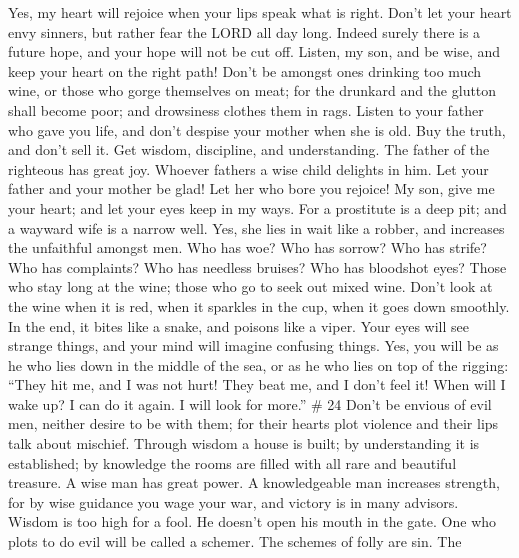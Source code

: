 Yes, my heart will rejoice when your lips speak what is right.
 Don't let your heart envy sinners, but rather fear the
LORD all day long.  Indeed surely there is a future hope,
and your hope will not be cut off.  Listen, my son, and be
wise, and keep your heart on the right path!  Don't be
amongst ones drinking too much wine, or those who gorge themselves on
meat;  for the drunkard and the glutton shall become poor;
and drowsiness clothes them in rags.  Listen to your father
who gave you life, and don't despise your mother when she is old.
 Buy the truth, and don't sell it. Get wisdom, discipline,
and understanding.  The father of the righteous has great
joy. Whoever fathers a wise child delights in him.  Let
your father and your mother be glad! Let her who bore you rejoice!
 My son, give me your heart; and let your eyes keep in my
ways.  For a prostitute is a deep pit; and a wayward wife
is a narrow well.  Yes, she lies in wait like a robber, and
increases the unfaithful amongst men.  Who has woe? Who has
sorrow? Who has strife? Who has complaints? Who has needless bruises?
Who has bloodshot eyes?  Those who stay long at the wine;
those who go to seek out mixed wine.  Don't look at the
wine when it is red, when it sparkles in the cup, when it goes down
smoothly.  In the end, it bites like a snake, and poisons
like a viper.  Your eyes will see strange things, and your
mind will imagine confusing things.  Yes, you will be as he
who lies down in the middle of the sea, or as he who lies on top of the
rigging:  ``They hit me, and I was not hurt! They beat me,
and I don't feel it! When will I wake up? I can do it again. I will look
for more.'' \# 24  Don't be envious of evil men, neither
desire to be with them;  for their hearts plot violence and
their lips talk about mischief.  Through wisdom a house is
built; by understanding it is established;  by knowledge the
rooms are filled with all rare and beautiful treasure.  A
wise man has great power. A knowledgeable man increases strength,
 for by wise guidance you wage your war, and victory is in
many advisors.  Wisdom is too high for a fool. He doesn't
open his mouth in the gate.  One who plots to do evil will
be called a schemer.  The schemes of folly are sin. The
